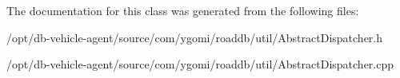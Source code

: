 The documentation for this class was generated from the following files\-:\begin{DoxyCompactItemize}
\item 
/opt/db-\/vehicle-\/agent/source/com/ygomi/roaddb/util/Abstract\-Dispatcher.\-h\item 
/opt/db-\/vehicle-\/agent/source/com/ygomi/roaddb/util/Abstract\-Dispatcher.\-cpp\end{DoxyCompactItemize}
